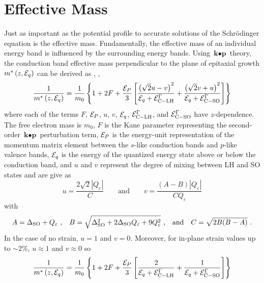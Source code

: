 {\section{Effective Mass}

Just as important as the potential profile to accurate solutions of the Schr\"{o}dinger equation is the effective mass.  Fundamentally, the effective mass of an individual energy band is influenced by the surrounding energy bands. Using $\textbf{k}\bullet \textbf{p}$ theory, the conduction band effective mass perpendicular to the plane of epitaxial growth $m^*\left(z,\EE_q\right)$ can be derived as \cite{Sirtori:PRB:1994}, \cite{Vurgaftman}, \cite{Sugawara:PRB:1993}
\begin{equation}
\label{chpt1eqn:effective_mass}
\frac{1}{m^*\left(z,\EE_q\right)} = \frac{1}{m_0} \left\{1+2F+\frac{\EE_P}{3} \left[ \frac{ \left(\sqrt{2} u-v\right)^2}{\EE_q + \EE_{\tn{C}-\tn{LH}}^\Gamma} + \frac{ \left(\sqrt{2} v+u \right)^2}{\EE_q + \EE_{\tn{C}-\tn{SO}}^\Gamma} \right] \right\}
\end{equation}
where each of the terms $F$, $\EE_P$, $u$, $v$, $\EE_q$, $\EE_{\tn{C}-\tn{LH}}^\Gamma$, and $\EE_{\tn{C}-\tn{SO}}^\Gamma$ have $z$-dependence.  The free electron mass is $m_0$, $F$ is the Kane parameter representing the second-order $\textbf{k}\bullet \textbf{p}$ perturbation term, $\EE_P$ is the energy-unit representation of the momentum matrix element between the $s$-like conduction bands and $p$-like valence bands, $\EE_q$ is the energy of the quantized energy state above or below the conduction band, and $u$ and $v$ represent the degree of mixing between LH and SO states and are give as
\begin{equation}
u = \frac{2\sqrt{2} |Q_\varepsilon|}{C} \qquad \text{and} \qquad
v = \frac{(A-B) |Q_\varepsilon|}{C Q_\varepsilon}
\end{equation}
with
\begin{equation}
A=\Delta_{\textnormal{SO}}+Q_\varepsilon \text{ ,} \quad
B=\sqrt{\Delta_{\textnormal{SO}}^2+2 \Delta_{\textnormal{SO}} Q_\varepsilon +9 Q_\varepsilon^2}\text{ ,}\quad \text{and} \quad
C=\sqrt{2 B (B-A)} \text{~.}
\end{equation}
In the case of no strain, $u=1$ and $v=0$.  Moreover, for in-plane strain values up to $\sim\!2$\%, $u\approx1$ and $v\approx0$ so
\begin{equation}
\label{chpt1eqn:effective_mass_simple}
\frac{1}{m^*\left(z,\EE_q\right)} = \frac{1}{m_0} \left\{ 1+2F+ \frac{\EE_P}{3} \left[ \frac{2}{\EE_q + \EE_{\tn{C}-\tn{LH}}^\Gamma} + \frac{1}{\EE_q + \EE_{\tn{C}-\tn{SO}}^\Gamma} \right] \right\}

\end{equation}}
